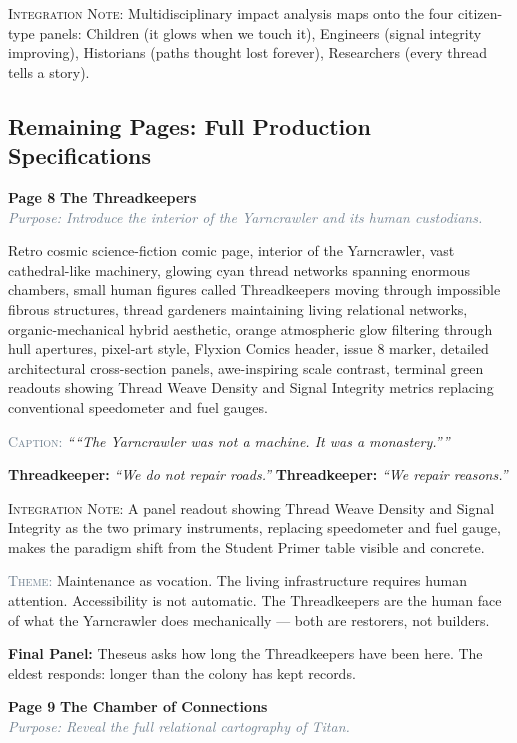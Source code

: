\documentclass[11pt]{article}
\newcommand{\dialogue}[2]{\medskip\noindent\textbf{\textcolor{titanOrange}{#1:}} \textit{``#2''}\medskip}
\newcommand{\pagecaption}[1]{\medskip\noindent\textcolor{slateGray}{\textsc{Caption:}} \textit{``#1''}\medskip}
\newcommand{\cliffhanger}[1]{\medskip\noindent\textcolor{cyanThread}{\textbf{Final Panel:}} #1\medskip}
\newcommand{\prompt}[1]{\begin{terminal}{\small #1}\end{terminal}}
\newcommand{\theme}[1]{\medskip\noindent\textcolor{slateGray}{\textsc{Theme:}} #1\medskip}
\newcommand{\integration}[1]{\medskip\noindent\textcolor{archiveGold}{\textsc{Integration Note:}} #1\medskip}
\newcommand{\pageheading}[3]{%
  \begin{pagebox}
    \noindent\textbf{\textcolor{titanOrange}{Page #1}} \hfill \textbf{\textcolor{cyanThread}{#2}}\\[2pt]
    \noindent\textcolor{slateGray}{\textit{Purpose: #3}}
  \end{pagebox}
  \medskip
}
\begin{document}
\integration{Multidisciplinary impact analysis maps onto the four citizen-type panels: Children (it glows when we touch it), Engineers (signal integrity improving), Historians (paths thought lost forever), Researchers (every thread tells a story).}

\vspace{1em}
\subsection*{Remaining Pages: Full Production Specifications}
\vspace{0.5em}

\pageheading{8}{The Threadkeepers}{Introduce the interior of the Yarncrawler and its human custodians.}

\prompt{Retro cosmic science-fiction comic page, interior of the Yarncrawler, vast cathedral-like machinery, glowing cyan thread networks spanning enormous chambers, small human figures called Threadkeepers moving through impossible fibrous structures, thread gardeners maintaining living relational networks, organic-mechanical hybrid aesthetic, orange atmospheric glow filtering through hull apertures, pixel-art style, Flyxion Comics header, issue 8 marker, detailed architectural cross-section panels, awe-inspiring scale contrast, terminal green readouts showing Thread Weave Density and Signal Integrity metrics replacing conventional speedometer and fuel gauges.}

\pagecaption{``The Yarncrawler was not a machine. It was a monastery.''}

\dialogue{Threadkeeper}{We do not repair roads.}
\dialogue{Threadkeeper}{We repair reasons.}

\integration{A panel readout showing Thread Weave Density and Signal Integrity as the two primary instruments, replacing speedometer and fuel gauge, makes the paradigm shift from the Student Primer table visible and concrete.}

\theme{Maintenance as vocation. The living infrastructure requires human attention. Accessibility is not automatic. The Threadkeepers are the human face of what the Yarncrawler does mechanically --- both are restorers, not builders.}

\cliffhanger{Theseus asks how long the Threadkeepers have been here. The eldest responds: longer than the colony has kept records.}

\vspace{0.5em}

\pageheading{9}{The Chamber of Connections}{Reveal the full relational cartography of Titan.}
\end{document}
